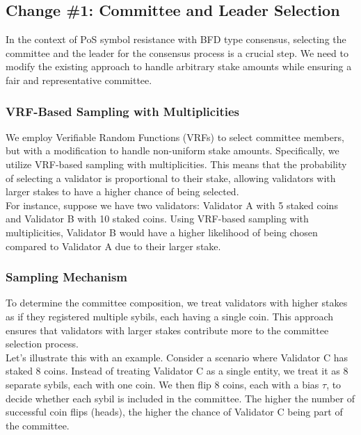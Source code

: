 \subsection{Change \#1: Committee and Leader Selection}
In the context of PoS symbol resistance with BFD type consensus, selecting the committee and the leader for the consensus process is a crucial step. We need to modify the existing approach to handle arbitrary stake amounts while ensuring a fair and representative committee.
\subsubsection{VRF-Based Sampling with Multiplicities}
We employ Verifiable Random Functions (VRFs) to select committee members, but with a modification to handle non-uniform stake amounts. Specifically, we utilize VRF-based sampling with multiplicities. This means that the probability of selecting a validator is proportional to their stake, allowing validators with larger stakes to have a higher chance of being selected.\\
For instance, suppose we have two validators: Validator A with 5 staked coins and Validator B with 10 staked coins. Using VRF-based sampling with multiplicities, Validator B would have a higher likelihood of being chosen compared to Validator A due to their larger stake.
\subsubsection{Sampling Mechanism}
To determine the committee composition, we treat validators with higher stakes as if they registered multiple sybils, each having a single coin. This approach ensures that validators with larger stakes contribute more to the committee selection process.\\
Let's illustrate this with an example. Consider a scenario where Validator C has staked 8 coins. Instead of treating Validator C as a single entity, we treat it as 8 separate sybils, each with one coin. We then flip 8 coins, each with a bias $\tau$, to decide whether each sybil is included in the committee. The higher the number of successful coin flips (heads), the higher the chance of Validator C being part of the committee.

